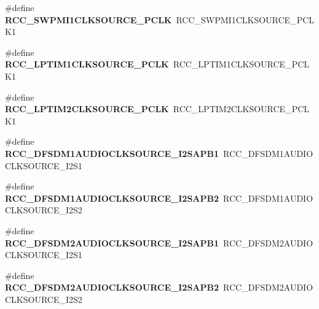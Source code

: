 \begin{DoxyCompactItemize}
\mbox{\label{group___h_a_l___r_c_c___aliased_ga0e9ef1db423c75e06fc65b7d0fce9b43}} 
\#define {\bfseries R\+C\+C\+\_\+\+S\+W\+P\+M\+I1\+C\+L\+K\+S\+O\+U\+R\+C\+E\+\_\+\+P\+C\+LK}~R\+C\+C\+\_\+\+S\+W\+P\+M\+I1\+C\+L\+K\+S\+O\+U\+R\+C\+E\+\_\+\+P\+C\+L\+K1
\item 
\mbox{\label{group___h_a_l___r_c_c___aliased_ga7c3c0ccdb79bafc7b079c70896bd1cb9}} 
\#define {\bfseries R\+C\+C\+\_\+\+L\+P\+T\+I\+M1\+C\+L\+K\+S\+O\+U\+R\+C\+E\+\_\+\+P\+C\+LK}~R\+C\+C\+\_\+\+L\+P\+T\+I\+M1\+C\+L\+K\+S\+O\+U\+R\+C\+E\+\_\+\+P\+C\+L\+K1
\item 
\mbox{\label{group___h_a_l___r_c_c___aliased_gaf782a8b81a037ca2c00107a3f311a9de}} 
\#define {\bfseries R\+C\+C\+\_\+\+L\+P\+T\+I\+M2\+C\+L\+K\+S\+O\+U\+R\+C\+E\+\_\+\+P\+C\+LK}~R\+C\+C\+\_\+\+L\+P\+T\+I\+M2\+C\+L\+K\+S\+O\+U\+R\+C\+E\+\_\+\+P\+C\+L\+K1
\item 
\mbox{\label{group___h_a_l___r_c_c___aliased_ga185a74951bfdcbac7413461f38001f2c}} 
\#define {\bfseries R\+C\+C\+\_\+\+D\+F\+S\+D\+M1\+A\+U\+D\+I\+O\+C\+L\+K\+S\+O\+U\+R\+C\+E\+\_\+\+I2\+S\+A\+P\+B1}~R\+C\+C\+\_\+\+D\+F\+S\+D\+M1\+A\+U\+D\+I\+O\+C\+L\+K\+S\+O\+U\+R\+C\+E\+\_\+\+I2\+S1
\item 
\mbox{\label{group___h_a_l___r_c_c___aliased_gaa9c8dabc3531ee6ed8bd93f92cb1a2b7}} 
\#define {\bfseries R\+C\+C\+\_\+\+D\+F\+S\+D\+M1\+A\+U\+D\+I\+O\+C\+L\+K\+S\+O\+U\+R\+C\+E\+\_\+\+I2\+S\+A\+P\+B2}~R\+C\+C\+\_\+\+D\+F\+S\+D\+M1\+A\+U\+D\+I\+O\+C\+L\+K\+S\+O\+U\+R\+C\+E\+\_\+\+I2\+S2
\item 
\mbox{\label{group___h_a_l___r_c_c___aliased_ga02a632d74c737409741d86f8997ff142}} 
\#define {\bfseries R\+C\+C\+\_\+\+D\+F\+S\+D\+M2\+A\+U\+D\+I\+O\+C\+L\+K\+S\+O\+U\+R\+C\+E\+\_\+\+I2\+S\+A\+P\+B1}~R\+C\+C\+\_\+\+D\+F\+S\+D\+M2\+A\+U\+D\+I\+O\+C\+L\+K\+S\+O\+U\+R\+C\+E\+\_\+\+I2\+S1
\item 
\mbox{\label{group___h_a_l___r_c_c___aliased_ga7b47dbfd0a1e0c7d4ebf206784d61740}} 
\#define {\bfseries R\+C\+C\+\_\+\+D\+F\+S\+D\+M2\+A\+U\+D\+I\+O\+C\+L\+K\+S\+O\+U\+R\+C\+E\+\_\+\+I2\+S\+A\+P\+B2}~R\+C\+C\+\_\+\+D\+F\+S\+D\+M2\+A\+U\+D\+I\+O\+C\+L\+K\+S\+O\+U\+R\+C\+E\+\_\+\+I2\+S2

\end{DoxyCompactItemize}
